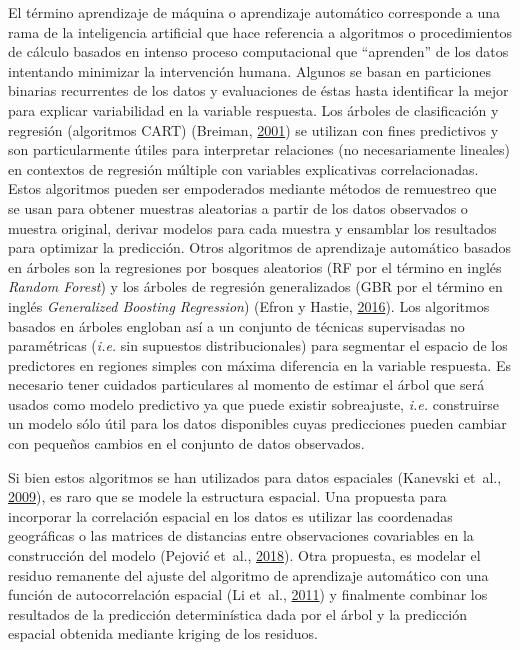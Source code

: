 \documentclass[11pt,b5paper,]{krantz}
\begin{document}
El término aprendizaje de máquina o aprendizaje automático corresponde a una rama de la inteligencia artificial que hace referencia a algoritmos o procedimientos de cálculo basados en intenso proceso computacional que ``aprenden'' de los datos intentando minimizar la intervención humana. Algunos se basan en particiones binarias recurrentes de los datos y evaluaciones de éstas hasta identificar la mejor para explicar variabilidad en la variable respuesta. Los árboles de clasificación y regresión (algoritmos CART) (Breiman, \protect\hyperlink{ref-Breiman_2001}{2001}) se utilizan con fines predictivos y son particularmente útiles para interpretar relaciones (no necesariamente lineales) en contextos de regresión múltiple con variables explicativas correlacionadas. Estos algoritmos pueden ser empoderados mediante métodos de remuestreo que se usan para obtener muestras aleatorias a partir de los datos observados o muestra original, derivar modelos para cada muestra y ensamblar los resultados para optimizar la predicción. Otros algoritmos de aprendizaje automático basados en árboles son la regresiones por bosques aleatorios (RF por el término en inglés \emph{Random Forest}) y los árboles de regresión generalizados (GBR por el término en inglés \emph{Generalized Boosting Regression}) (Efron y Hastie, \protect\hyperlink{ref-Efron_Hastie_2016}{2016}). Los algoritmos basados en árboles engloban así a un conjunto de técnicas supervisadas no paramétricas (\emph{i.e.} sin supuestos distribucionales) para segmentar el espacio de los predictores en regiones simples con máxima diferencia en la variable respuesta. Es necesario tener cuidados particulares al momento de estimar el árbol que será usados como modelo predictivo ya que puede existir sobreajuste, \emph{i.e.} construirse un modelo sólo útil para los datos disponibles cuyas predicciones pueden cambiar con pequeños cambios en el conjunto de datos observados.

Si bien estos algoritmos se han utilizados para datos espaciales (Kanevski et~al., \protect\hyperlink{ref-Kanevski_Timonin_Pozdnukhov_Ritter_2009}{2009}), es raro que se modele la estructura espacial. Una propuesta para incorporar la correlación espacial en los datos es utilizar las coordenadas geográficas o las matrices de distancias entre observaciones covariables en la construcción del modelo (Pejović et~al., \protect\hyperlink{ref-Pejoviux107_Nikoliux107_Heuvelink_Hengl_Kilibarda_Bajat_2018}{2018}). Otra propuesta, es modelar el residuo remanente del ajuste del algoritmo de aprendizaje automático con una función de autocorrelación espacial (Li et~al., \protect\hyperlink{ref-Li_Heap_Potter_Daniell_2011}{2011}) y finalmente combinar los resultados de la predicción determinística dada por el árbol y la predicción espacial obtenida mediante kriging de los residuos.
\end{document}
